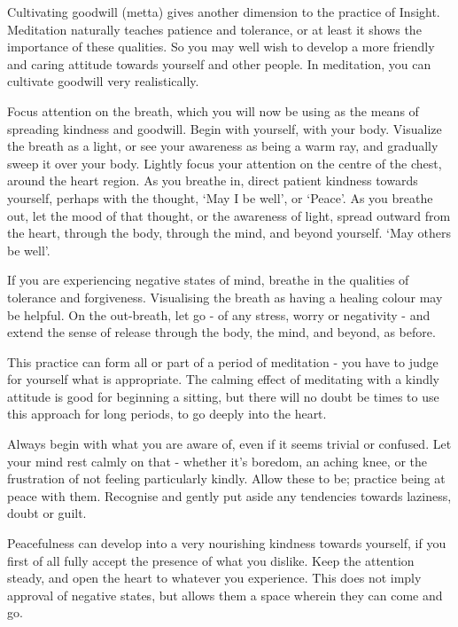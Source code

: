 
Cultivating goodwill (metta) gives another dimension to the practice of
Insight. Meditation naturally teaches patience and tolerance, or at
least it shows the importance of these qualities. So you may well wish
to develop a more friendly and caring attitude towards yourself and
other people. In meditation, you can cultivate goodwill very
realistically.

Focus attention on the breath, which you will now be using as the means
of spreading kindness and goodwill. Begin with yourself, with your body.
Visualize the breath as a light, or see your awareness as being a warm
ray, and gradually sweep it over your body. Lightly focus your attention
on the centre of the chest, around the heart region. As you breathe in,
direct patient kindness towards yourself, perhaps with the thought, `May
I be well', or `Peace'. As you breathe out, let the mood of that
thought, or the awareness of light, spread outward from the heart,
through the body, through the mind, and beyond yourself. `May others be
well'.

If you are experiencing negative states of mind, breathe in the
qualities of tolerance and forgiveness. Visualising the breath as having
a healing colour may be helpful. On the out-breath, let go - of any
stress, worry or negativity - and extend the sense of release through
the body, the mind, and beyond, as before.

This practice can form all or part of a period of meditation - you have
to judge for yourself what is appropriate. The calming effect of
meditating with a kindly attitude is good for beginning a sitting, but
there will no doubt be times to use this approach for long periods, to
go deeply into the heart.

Always begin with what you are aware of, even if it seems trivial or
confused. Let your mind rest calmly on that - whether it's boredom, an
aching knee, or the frustration of not feeling particularly kindly.
Allow these to be; practice being at peace with them. Recognise and
gently put aside any tendencies towards laziness, doubt or guilt.

Peacefulness can develop into a very nourishing kindness towards
yourself, if you first of all fully accept the presence of what you
dislike. Keep the attention steady, and open the heart to whatever you
experience. This does not imply approval of negative states, but allows
them a space wherein they can come and go.

